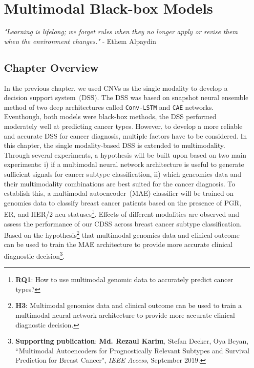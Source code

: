 \chapter{Multimodal Black-box Models}
\label{chapter:multiodality}

\textit{"Learning is lifelong; we forget rules when they no longer apply or revise them when the environment changes."} - Ethem Alpaydin 

\section{Chapter Overview}
In the previous chapter, we used CNVs as the single modality to develop a decision support system~(DSS). The DSS was based on snapshot neural ensemble method of two deep architectures called \texttt{Conv-LSTM} and \texttt{CAE} networks. Eventhough, both models were black-box methods, the DSS performed moderately well at predicting cancer types. However, to develop a more reliable and accurate DSS for cancer diagnosis, multiple factors have to be considered. In this chapter, the single modality-based DSS is extended to multimodality. Through several experiments, a hypothesis will be built upon based on two main experiments: i) if a multimodal neural network architecture is useful to generate sufficient signals for cancer subtype classification, ii) which geneomics data and their multimodality combinations are best suited for the cancer diagnosis. To establish this, a multimodal autoencoder~(MAE) classifier will be trained on genomics data to classify breast cancer patients based on the presence of PGR, ER, and HER/2 neu statuses\footnote{\textbf{RQ1}: How to use multimodal genomic data to accurately predict cancer types?}. Effects of different modalities are observed and assess the performance of our CDSS across breast cancer subtype classification. Based on the hypothesis\footnote{\textbf{H3}: Multimodal genomics data and clinical outcome can be used to train a multimodal neural network architecture to provide more accurate clinical diagnostic decision.} that multimodal genomics data and clinical outcome can be used to train the MAE architecture to provide more accurate clinical diagnostic decision\footnote{\textbf{Supporting publication}: \textbf{Md. Rezaul Karim}, Stefan Decker, Oya Beyan, ``Multimodal Autoencoders for Prognostically Relevant Subtypes and Survival Prediction for Breast Cancer", \emph{IEEE Access}, September 2019.}. 

